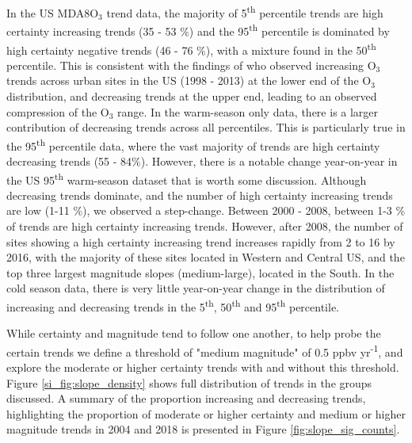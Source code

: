 \documentclass[journal abbreviation, manuscript]{copernicus}
\begin{document}
In the US MDA8O$_3$ trend data, the majority of 5\textsuperscript{th} percentile trends are high certainty increasing trends (35 - 53 \%) and the 95\textsuperscript{th} percentile is dominated by high certainty negative trends (46 - 76 \%), with a mixture found in the 50\textsuperscript{th} percentile. This is consistent with the findings of \cite{Simon_2015} who observed increasing O$_3$ trends across urban sites in the US (1998 - 2013) at the lower end of the O$_3$ distribution, and decreasing trends at the upper end, leading to an observed compression of the O$_3$ range. In the warm-season only data, there is a larger contribution of decreasing trends across all percentiles. This is particularly true in the 95\textsuperscript{th} percentile data, where the vast majority of trends are high certainty decreasing trends (55 - 84\%). However, there is a notable change year-on-year in the US 95\textsuperscript{th} warm-season dataset that is worth some discussion. Although decreasing trends dominate, and the number of high certainty increasing trends are low (1-11 \%), we observed a step-change. Between 2000 - 2008, between 1-3 \% of trends are high certainty increasing trends. However, after 2008, the number of sites showing a high certainty increasing trend increases rapidly from 2 to 16 by 2016, with the majority of these sites located in Western and Central US, and the top three largest magnitude slopes (medium-large), located in the South. In the cold season data, there is very little year-on-year change in the distribution of increasing and decreasing trends in the 5\textsuperscript{th}, 50\textsuperscript{th} and 95\textsuperscript{th} percentile.

While certainty and magnitude tend to follow one another, to help probe the certain trends we define a threshold of "medium magnitude" of 0.5 ppbv yr\textsuperscript{-1}, and explore the moderate or higher certainty trends with and without this threshold. Figure \ref{si_fig:slope_density} shows full distribution of trends in the groups discussed. A summary of the proportion increasing and decreasing trends, highlighting the proportion of moderate or higher certainty and medium or higher magnitude trends in 2004 and 2018 is presented in Figure \ref{fig:slope_sig_counts}.
\end{document}
